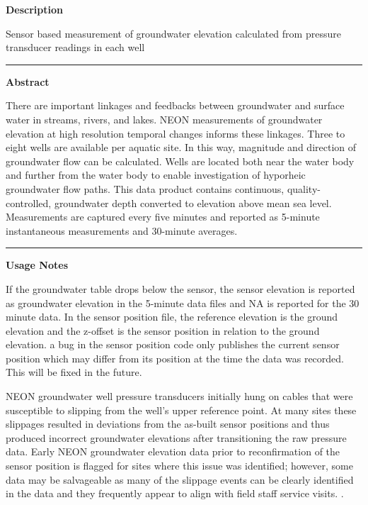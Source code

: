 \documentclass[]{article}
\begin{document}
\textbf{Description}

Sensor based measurement of groundwater elevation calculated from
pressure transducer readings in each well

\begin{center}\rule{0.5\linewidth}{\linethickness}\end{center}

\textbf{Abstract}

There are important linkages and feedbacks between groundwater and
surface water in streams, rivers, and lakes. NEON measurements of
groundwater elevation at high resolution temporal changes informs these
linkages. Three to eight wells are available per aquatic site. In this
way, magnitude and direction of groundwater flow can be calculated.
Wells are located both near the water body and further from the water
body to enable investigation of hyporheic groundwater flow paths. This
data product contains continuous, quality-controlled, groundwater depth
converted to elevation above mean sea level. Measurements are captured
every five minutes and reported as 5-minute instantaneous measurements
and 30-minute averages.

\begin{center}\rule{0.5\linewidth}{\linethickness}\end{center}

\textbf{Usage Notes}

If the groundwater table drops below the sensor, the sensor elevation is
reported as groundwater elevation in the 5-minute data files and NA is
reported for the 30 minute data. In the sensor position file, the
reference elevation is the ground elevation and the z-offset is the
sensor position in relation to the ground elevation. a bug in the sensor
position code only publishes the current sensor position which may
differ from its position at the time the data was recorded. This will be
fixed in the future.

NEON groundwater well pressure transducers initially hung on cables that
were susceptible to slipping from the well's upper reference point. At
many sites these slippages resulted in deviations from the as-built
sensor positions and thus produced incorrect groundwater elevations
after transitioning the raw pressure data. Early NEON groundwater
elevation data prior to reconfirmation of the sensor position is flagged
for sites where this issue was identified; however, some data may be
salvageable as many of the slippage events can be clearly identified in
the data and they frequently appear to align with field staff service
visits. \newpage
.
\end{document}
